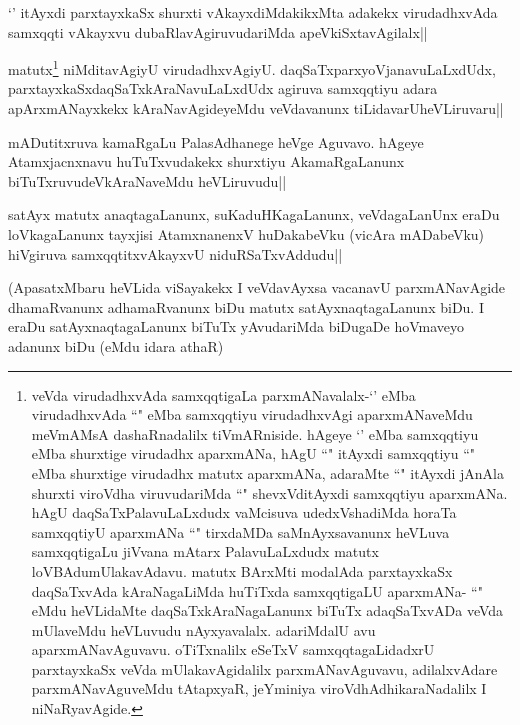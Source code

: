 
\begin{artha}
`\stext ' itAyxdi parxtayxkaSx shurxti vAkayxdiMdakikxMta adakekx virudadhxvAda samxqqti vAkayxvu dubaRlavAgiruvudariMda apeVkiSxtavAgilalx||
\end{artha}

\begin{artha}
matutx\footnote[1]{veVda virudadhxvAda samxqqtigaLa parxmANavalalx-`\stext' eMba virudadhxvAda ``\stext " eMba samxqqtiyu virudadhxvAgi aparxmANaveMdu meVmAMsA dashaRnadalilx tiVmARniside. hAgeye `\stext' eMba samxqqtiyu \stext eMba shurxtige virudadhx aparxmANa, hAgU ``\stext " itAyxdi samxqqtiyu ``\stext " eMba shurxtige virudadhx matutx aparxmANa, adaraMte ``\stext " itAyxdi jAnAla shurxti viroVdha viruvudariMda ``\stext " shevxVditAyxdi samxqqtiyu aparxmANa. hAgU daqSaTxPalavuLaLxdudx vaMcisuva udedxVshadiMda horaTa samxqqtiyU aparxmANa ``\stext " tirxdaMDa saMnAyxsavanunx heVLuva samxqqtigaLu jiVvana mAtarx PalavuLaLxdudx matutx loVBAdumUlakavAdavu. matutx BArxMti modalAda parxtayxkaSx daqSaTxvAda kAraNagaLiMda huTiTxda samxqqtigaLU aparxmANa- ``\stext " eMdu heVLidaMte daqSaTxkAraNagaLanunx biTuTx adaqSaTxvADa veVda mUlaveMdu heVLuvudu nAyxyavalalx. adariMdalU avu aparxmANavAguvavu. oTiTxnalilx eSeTxV samxqqtagaLidadxrU parxtayxkaSx veVda mUlakavAgidalilx parxmANavAguvavu, adilalxvAdare parxmANavAguveMdu tAtapxyaR, jeYminiya viroVdhAdhikaraNadalilx I niNaRyavAgide.} niMditavAgiyU virudadhxvAgiyU. daqSaTxparxyoVjanavuLaLxdUdx, parxtayxkaSxdaqSaTxkAraNavuLaLxdUdx agiruva samxqqtiyu adara apArxmANayxkekx kAraNavAgideyeMdu veVdavanunx tiLidavarUheVLiruvaru||
\end{artha}

\begin{artha}%
mADutitxruva kamaRgaLu PalasAdhanege heVge Aguvavo. hAgeye Atamxjacnxnavu huTuTxvudakekx shurxtiyu AkamaRgaLanunx biTuTxruvudeVkAraNaveMdu heVLiruvudu||
\end{artha}


\begin{artha}
satAyx matutx anaqtagaLanunx, suKaduHKagaLanunx, veVdagaLanUnx eraDu loVkagaLanunx tayxjisi AtamxnanenxV huDakabeVku (vicAra mADabeVku) hiVgiruva samxqqtitxvAkayxvU niduRSaTxvAddudu||
\end{artha}

\begin{artha}
(ApasatxMbaru heVLida viSayakekx I veVdavAyxsa vacanavU parxmANavAgide dhamaRvanunx adhamaRvanunx biDu matutx satAyxnaqtagaLanunx biDu. I eraDu satAyxnaqtagaLanunx biTuTx yAvudariMda biDugaDe hoVmaveyo adanunx biDu (eMdu idara athaR) 
\end{artha}

